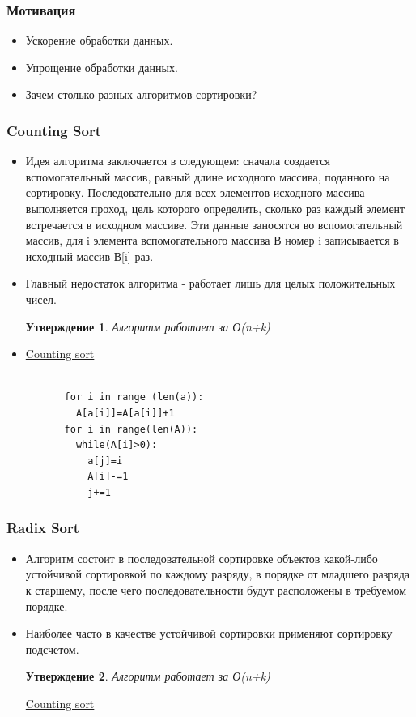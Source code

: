\documentclass[t]{beamer}  %
\newtheorem{rstate}{Утверждение}
\begin{document}
\begin{frame}[t]
	\frametitle{Мотивация}
		\begin{itemize}
			\pause
	\item Ускорение обработки данных. \pause
	\item Упрощение обработки данных.  \pause
	\item Зачем столько разных алгоритмов сортировки?  \pause
\end{itemize}
\end{frame}

\begin{frame}[t]
	\frametitle{Counting Sort}
	\begin{itemize}
		\pause
		\item Идея алгоритма заключается в следующем: сначала создается вспомогательный массив, равный длине исходного массива, поданного на сортировку. Последовательно для всех элементов исходного массива выполняется проход, цель которого определить, сколько раз каждый элемент встречается в исходном массиве. Эти данные заносятся во вспомогательный массив, для i элемента вспомогательного массива В номер i записывается в исходный массив В[i] раз.\pause
		\item Главный недостаток алгоритма - работает лишь для целых положительных чисел.
			\begin{rstate}
			Алгоритм работает за О(n+k)    
	     	\end{rstate}
     	\item
     	\href{images/gif1.gif}{Counting sort}
	\end{itemize}
\end{frame}

		\begin{lstlisting}[label=some-code,caption={Реализация на Python}]
		
          for i in range (len(a)):
            A[a[i]]=A[a[i]]+1
          for i in range(len(A)):
            while(A[i]>0):
              a[j]=i
              A[i]-=1
              j+=1
         \end{lstlisting}


\begin{frame}[t]
	\frametitle{Radix Sort}
	\begin{itemize}
		\pause
		\item Алгоритм состоит в последовательной сортировке объектов какой-либо устойчивой сортировкой по каждому разряду, в порядке от младшего разряда к старшему, после чего последовательности будут расположены в требуемом порядке. \pause
		\item Наиболее часто в качестве устойчивой сортировки применяют сортировку подсчетом.
			\begin{rstate}
			Алгоритм работает за О(n+k)    
		\end{rstate}
		\href{images/gif2.gif}{Counting sort}
	\end{itemize}
\end{frame}
\end{document}
